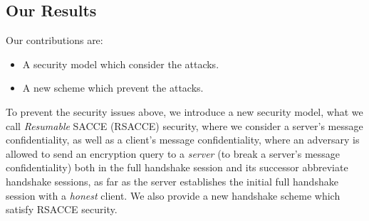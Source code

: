 \documentclass[11pt,a4j]{jarticle}
\def\thanks{~\\[.5\baselineskip]{\bf 謝辞}\hspace*{1zw}}
\begin{document}
\subsection{Our Results} \label{sec:proposal}

Our contributions are:
\begin{itemize}
 \item{A security model which consider the attacks.}
 \item{A new scheme which prevent the attacks.}
\end{itemize}

To prevent the security issues above,
we introduce a new security model, what we call \textit{Resumable} SACCE (RSACCE) security,
where we consider a server's message confidentiality, as well as a client's message confidentiality,
where an adversary is allowed to send an encryption query to a \textit{server}
(to break a server's message confidentiality)
both in the full handshake session and its successor abbreviate handshake sessions,
as far as the server establishes the initial full handshake session
with a \textit{honest} client.
We also provide a new handshake scheme which satisfy RSACCE security.






\end{document}
